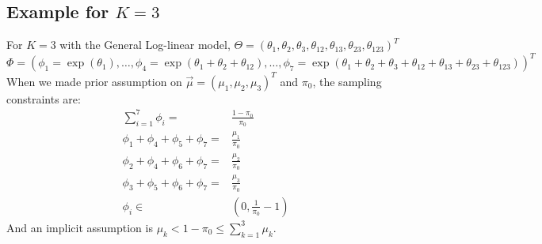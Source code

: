 \documentclass[11 pt, a4paper]{article}  %
\begin{document}
\newpage
\subsection{Example for $K=3$}
For $K=3$ with the General Log-linear model,
$\Theta = (\theta_1, \theta_2, \theta_3, \theta_{12}, \theta_{13}, \theta_{23}, \theta_{123})^T$\\
$\Phi = (\phi_1 = \exp{(\theta_1)}, \ldots, \phi_4 = \exp{(\theta_1 + \theta_2 + \theta_{12})}, \ldots, 
\phi_7 = \exp{(\theta_1 + \theta_2 + \theta_3 + \theta_{12} + \theta_{13} + \theta_{23} + \theta_{123})} )^T$
When we made prior assumption on $\vec{\mu} = (\mu_1, \mu_2, \mu_3)^T$ and $\pi_0$, the sampling constraints are:
\begin{align*}
\sum_{i=1}^7 \phi_i = & \frac{1-\pi_0}{\pi_0}\\
\phi_1 + \phi_4 + \phi_5 + \phi_7 = & \frac{\mu_1}{\pi_0}\\
\phi_2 + \phi_4 + \phi_6 + \phi_7 = & \frac{\mu_2}{\pi_0}\\
\phi_3 + \phi_5 + \phi_6 + \phi_7 = & \frac{\mu_3}{\pi_0}\\
\phi_i \in & (0, \frac{1}{\pi_0}-1)
\end{align*}
And an implicit assumption is $\mu_k < 1 - \pi_0 \leq \sum_{k=1}^3 \mu_k$.\\
\end{document}
